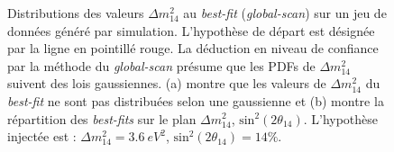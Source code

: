 {\begin{figure}[h!]
\begin{subfigure}[b]{0.49\textwidth}
\end{subfigure}
\caption[Distributions des valeurs $\Delta m^2_{14}$ au \textit{best-fit} (\textit{global-scan}) sur un jeu de données généré par simulation]{Distributions des valeurs $\Delta m^2_{14}$ au \textit{best-fit} (\textit{global-scan}) sur un jeu de données généré par simulation. L'hypothèse de départ est désignée par la ligne en pointillé rouge. La déduction en niveau de confiance par la méthode du \textit{global-scan} présume que les PDFs de $\Delta m_{14}^2$ suivent des lois gaussiennes. (a) montre que les valeurs de $\Delta m_{14}^2$ du \textit{best-fit} ne sont pas distribuées selon une gaussienne et (b) montre la répartition des \textit{best-fits} sur le plan $\Delta m_{14}^2$, $\textrm{sin}^2(2\theta_{14})$. L'hypothèse injectée est : $\Delta m_{14}^2 = \SI{3.6}{eV^2}$, $\textrm{sin}^2(2\theta_{14}) = 14\%$.}
\label{fig:profile_dm2}
\end{figure}
%
%
%
%

}
